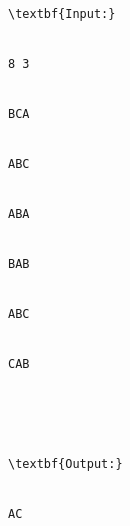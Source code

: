 \begin{verbatim}
\textbf{Input:}


8 3


BCA


ABC


ABA


BAB


ABC


CAB





\textbf{Output:}


AC\end{verbatim}